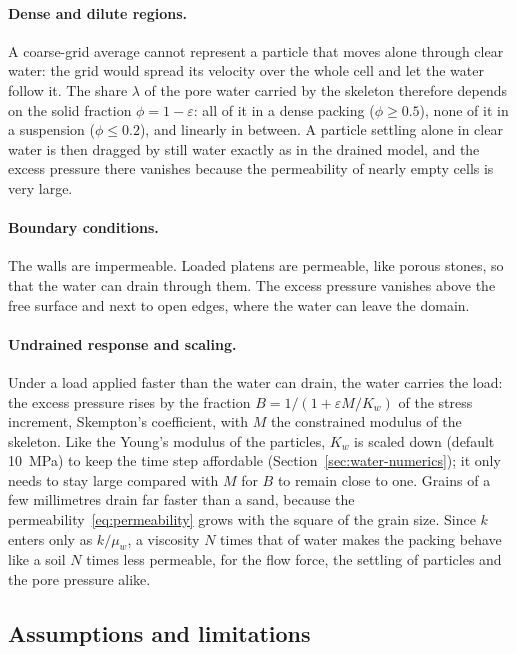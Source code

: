 \paragraph{Dense and dilute regions.}  A coarse-grid average cannot represent a
particle that moves alone through clear water: the grid would spread its
velocity over the whole cell and let the water follow it.  The share $\lambda$
of the pore water carried by the skeleton therefore depends on the solid
fraction $\phi=1-\varepsilon$: all of it in a dense packing ($\phi\ge0.5$), none of
it in a suspension ($\phi\le0.2$), and linearly in between.  A particle settling
alone in clear water is then dragged by still water exactly as in the drained
model, and the excess pressure there vanishes because the permeability of
nearly empty cells is very large.

\paragraph{Boundary conditions.}  The walls are impermeable.  Loaded platens are
permeable, like porous stones, so that the water can drain through them.  The
excess pressure vanishes above the free surface and next to open edges, where
the water can leave the domain.

\paragraph{Undrained response and scaling.}  Under a load applied faster than the
water can drain, the water carries the load: the excess pressure rises by the
fraction $B=1/(1+\varepsilon M/K_{w})$ of the stress increment, Skempton's
coefficient, with $M$ the constrained modulus of the skeleton.  Like the Young's
modulus of the particles, $K_{w}$ is scaled down (default
\qty{10}{\mega\pascal}) to keep the time step affordable
(Section~\ref{sec:water-numerics}); it only needs to stay large compared with $M$
for $B$ to remain close to one.  Grains of a few millimetres drain far faster
than a sand, because the permeability~\eqref{eq:permeability} grows with the
square of the grain size.  Since $k$ enters only as $k/\mu_{w}$, a viscosity $N$
times that of water makes the packing behave like a soil $N$ times less
permeable, for the flow force, the settling of particles and the pore pressure
alike.

\subsection{Assumptions and limitations}

